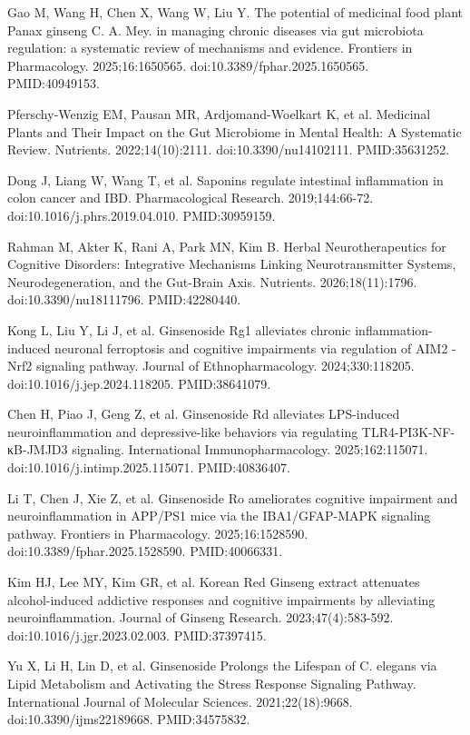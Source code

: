 \documentclass[12pt,oneside]{book}
\newcommand{\reff}[2]{\par\hangindent=7mm\hangafter=1\noindent[#1]\hspace{2mm}#2\par}
\begin{document}
\reff{25}{Gao M, Wang H, Chen X, Wang W, Liu Y. The potential of medicinal food plant Panax ginseng C. A. Mey. in managing chronic diseases via gut microbiota regulation: a systematic review of mechanisms and evidence. Frontiers in Pharmacology. 2025;16:1650565. doi:10.3389/fphar.2025.1650565. PMID:40949153.}

\reff{26}{Pferschy-Wenzig EM, Pausan MR, Ardjomand-Woelkart K, et al. Medicinal Plants and Their Impact on the Gut Microbiome in Mental Health: A Systematic Review. Nutrients. 2022;14(10):2111. doi:10.3390/nu14102111. PMID:35631252.}

\reff{27}{Dong J, Liang W, Wang T, et al. Saponins regulate intestinal inflammation in colon cancer and IBD. Pharmacological Research. 2019;144:66-72. doi:10.1016/j.phrs.2019.04.010. PMID:30959159.}

\reff{28}{Rahman M, Akter K, Rani A, Park MN, Kim B. Herbal Neurotherapeutics for Cognitive Disorders: Integrative Mechanisms Linking Neurotransmitter Systems, Neurodegeneration, and the Gut-Brain Axis. Nutrients. 2026;18(11):1796. doi:10.3390/nu18111796. PMID:42280440.}

\reff{29}{Kong L, Liu Y, Li J, et al. Ginsenoside Rg1 alleviates chronic inflammation-induced neuronal ferroptosis and cognitive impairments via regulation of AIM2 - Nrf2 signaling pathway. Journal of Ethnopharmacology. 2024;330:118205. doi:10.1016/j.jep.2024.118205. PMID:38641079.}

\reff{30}{Chen H, Piao J, Geng Z, et al. Ginsenoside Rd alleviates LPS-induced neuroinflammation and depressive-like behaviors via regulating TLR4-PI3K-NF-κB-JMJD3 signaling. International Immunopharmacology. 2025;162:115071. doi:10.1016/j.intimp.2025.115071. PMID:40836407.}

\reff{31}{Li T, Chen J, Xie Z, et al. Ginsenoside Ro ameliorates cognitive impairment and neuroinflammation in APP/PS1 mice via the IBA1/GFAP-MAPK signaling pathway. Frontiers in Pharmacology. 2025;16:1528590. doi:10.3389/fphar.2025.1528590. PMID:40066331.}

\reff{32}{Kim HJ, Lee MY, Kim GR, et al. Korean Red Ginseng extract attenuates alcohol-induced addictive responses and cognitive impairments by alleviating neuroinflammation. Journal of Ginseng Research. 2023;47(4):583-592. doi:10.1016/j.jgr.2023.02.003. PMID:37397415.}

\reff{33}{Yu X, Li H, Lin D, et al. Ginsenoside Prolongs the Lifespan of C. elegans via Lipid Metabolism and Activating the Stress Response Signaling Pathway. International Journal of Molecular Sciences. 2021;22(18):9668. doi:10.3390/ijms22189668. PMID:34575832.}
\end{document}
